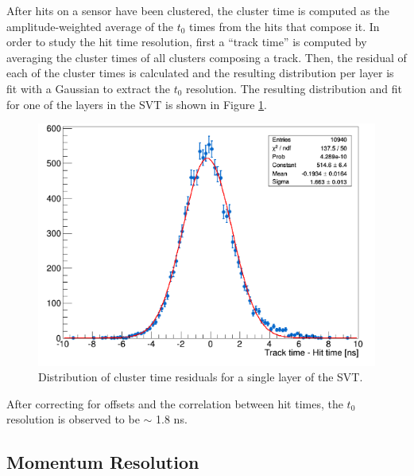 After hits on a sensor have been
clustered, the cluster time is computed as the amplitude-weighted average
of the $t_0$ times from the hits that compose it.  In order to study the hit
time resolution, first a ``track time'' is computed by averaging the cluster 
times of all clusters composing a track.  Then, the residual of each of the 
cluster times is
calculated and the resulting distribution per layer is fit with a Gaussian
to extract the $t_0$ resolution.  The resulting distribution and fit for 
one of the layers in the SVT is shown in Figure \ref{fig:t0_res}.  
\begin{figure}[h!b]
    \centering
    \includegraphics[width=.7\textwidth]{images/t0_res.png}
    \caption{Distribution of cluster time residuals for a single layer of
    the SVT.}
    \label{fig:t0_res}
\end{figure} 
After correcting for offsets and the correlation between hit times, 
the $t_{0}$ resolution is observed to be $\sim$ 
1.8 ns.

\subsection{Momentum Resolution}

